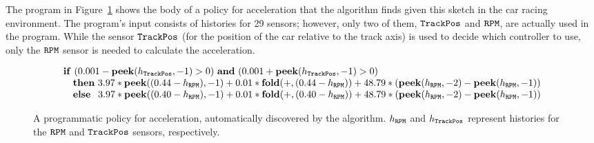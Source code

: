 The program in Figure~\ref{fig:code} shows the body of a policy for
acceleration that the \algo algorithm finds given this sketch in the
\torcs car racing environment. The program's input consists of histories for 29 sensors; however, only two of them, $\mathtt{TrackPos}$ and $\mathtt{RPM}$, are actually used in the program. While the sensor $\mathtt{TrackPos}$ (for the position of the car relative to the track axis) is used to decide which controller to use, only the $\mathtt{RPM}$ sensor is needed to calculate the acceleration. 

\begin{figure}[ht]
	\vskip 0.1in
	$$
	\begin{array}{l}
	\mathbf{if}~(0.001 - \mathbf{peek}(h_{\mathtt{TrackPos}}, -1) > 0 )~\mathbf{and}~(0.001 + \mathbf{peek}(h_{\mathtt{TrackPos}}, -1) > 0) \\
	\quad \mathbf{then}~ 3.97 * \mathbf{peek}((0.44 - h_{\mathtt{RPM}}), -1) +  0.01 * \mathbf{fold}(+, (0.44 - h_{\mathtt{RPM}})) + 48.79 * ( \mathbf{peek}(h_{\mathtt{RPM}}, -2)- \mathbf{peek}(h_{\mathtt{RPM}}, -1)) \\
	\quad \mathbf{else}~ \;\, 3.97 * \mathbf{peek}((0.40 - h_{\mathtt{RPM}}), -1) + 0.01 * \mathbf{fold}(+, (0.40 - h_{\mathtt{RPM}})) +  48.79* ( \mathbf{peek}(h_{\mathtt{RPM}}, -2)- \mathbf{peek}(h_{\mathtt{RPM}}, -1))
	\end{array}
	$$
	\caption{A programmatic policy for acceleration, automatically discovered by the \algo algorithm. $h_{\mathtt{RPM}}$ and $h_{\mathtt{TrackPos}}$ represent histories for the $\mathtt{RPM}$ and $\mathtt{TrackPos}$ sensors, respectively.
	}
	\label{fig:code}
\end{figure}